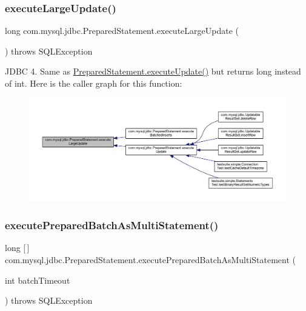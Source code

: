 \subsubsection{\texorpdfstring{execute\+Large\+Update()}{executeLargeUpdate()}}
{\footnotesize\ttfamily long com.\+mysql.\+jdbc.\+Prepared\+Statement.\+execute\+Large\+Update (\begin{DoxyParamCaption}{ }\end{DoxyParamCaption}) throws S\+Q\+L\+Exception}

J\+D\+BC 4. Same as \mbox{\hyperlink{classcom_1_1mysql_1_1jdbc_1_1_prepared_statement_a356cdeaae7b10fb79da4806e829a2190}{Prepared\+Statement.\+execute\+Update()}} but returns long instead of int. Here is the caller graph for this function\+:
\nopagebreak
\begin{figure}[H]
\begin{center}
\leavevmode
\includegraphics[width=350pt]{classcom_1_1mysql_1_1jdbc_1_1_prepared_statement_a9db54f06b57ab9446798d306d59aeefc_icgraph}
\end{center}
\end{figure}
\mbox{\label{classcom_1_1mysql_1_1jdbc_1_1_prepared_statement_ad3cdc3e336070c453b5878ce9ba8a0cc}} 
\subsubsection{\texorpdfstring{execute\+Prepared\+Batch\+As\+Multi\+Statement()}{executePreparedBatchAsMultiStatement()}}
{\footnotesize\ttfamily long \mbox{[}$\,$\mbox{]} com.\+mysql.\+jdbc.\+Prepared\+Statement.\+execute\+Prepared\+Batch\+As\+Multi\+Statement (\begin{DoxyParamCaption}\item[{int}]{batch\+Timeout }\end{DoxyParamCaption}) throws S\+Q\+L\+Exception\hspace{0.3cm}{\ttfamily [protected]}}

